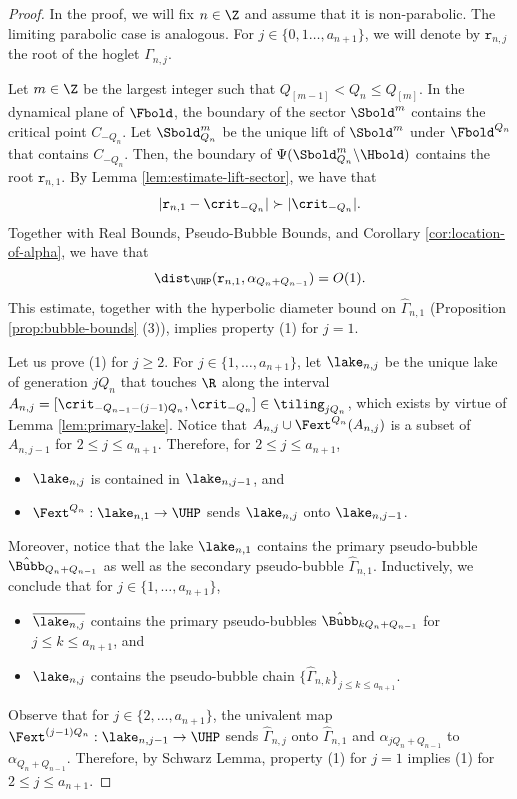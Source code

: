 \documentclass{amsart}
\begin{document}
\begin{proof}
    In the proof, we will fix $n \in \Z$ and assume that it is non-parabolic. 
    The limiting parabolic case is analogous.
    For $j \in \{0,1\ldots, a_{n+1}\}$, we will denote by $\mathtt{r}_{n,j}$ the root of the hoglet $\Gamma_{n,j}$.

    Let $m \in \Z$ be the largest integer such that $Q_{[m-1]} < Q_{n} \leq Q_{[m]}$.
    In the dynamical plane of $\Fbold$, the boundary of the sector $\Sbold^m$ contains the critical point $C_{-Q_n}$.
    Let $\Sbold^m_{Q_n}$ be the unique lift of $\Sbold^m$ under $\Fbold^{Q_n}$ that contains $C_{-Q_n}$.
    Then, the boundary of $\Psi(\Sbold^m_{Q_n} \backslash \Hbold)$ contains the root $\mathtt{r}_{n,1}$.
    By Lemma \ref{lem:estimate-lift-sector}, we have that 
    \[
    |\mathtt{r}_{n,1} - \crit_{-Q_n}| \succ |\crit_{-Q_n}|.
    \]
    Together with Real Bounds, Pseudo-Bubble Bounds, and Corollary \ref{cor:location-of-alpha}, we have that 
    \[
        \dist_{\UHP}(\mathtt{r}_{n,1},\alpha_{Q_n+Q_{n-1}}) = O(1).
    \]
    This estimate, together with the hyperbolic diameter bound on $\hat{\Gamma}_{n,1}$ (Proposition \ref{prop:bubble-bounds} (3)), implies property (1) for $j=1$.

    Let us prove (1) for $j \geq 2$.
    For $j \in \{1,\ldots,a_{n+1}\}$, let $\lake_{n,j}$ be the unique lake of generation $j Q_n$ that touches $\R$ along the interval $A_{n,j} = [\crit_{-Q_{n-1}-(j-1)Q_n},\crit_{-Q_n}] \in \tiling_{jQ_n}$,
    which exists by virtue of Lemma \ref{lem:primary-lake}.
    Notice that $A_{n,j} \cup \Fext^{Q_n}(A_{n,j})$ is a subset of $A_{n,j-1}$ for $2 \leq j \leq a_{n+1}$.
    Therefore, for $2 \leq j \leq a_{n+1}$, 
    \begin{itemize}
        \item $\lake_{n,j}$ is contained in $\lake_{n,j-1}$, and 
        \item $\Fext^{Q_n}: \lake_{n,1} \to \UHP$ sends $\lake_{n,j}$ onto $\lake_{n,j-1}$.
    \end{itemize}
    Moreover, notice that the lake $\lake_{n,1}$ contains the primary pseudo-bubble $\hat{\Bubb}_{Q_n+Q_{n-1}}$ as well as the secondary pseudo-bubble $\hat{\Gamma}_{n,1}$.
    Inductively, we conclude that for $j \in \{1,\ldots,a_{n+1}\}$, 
    \begin{itemize}
        \item $\overline{\lake_{n,j}}$ contains the primary pseudo-bubbles $\hat{\Bubb}_{k Q_n+ Q_{n-1}}$ for $j\leq k \leq a_{n+1}$, and
        \item $\lake_{n,j}$ contains the pseudo-bubble chain $\{ \hat{\Gamma}_{n,k}\}_{j \leq k \leq a_{n+1}}$. 
    \end{itemize}
    Observe that for $j \in \{2,\ldots,a_{n+1}\}$, the univalent map $\Fext^{(j-1) Q_n}: \lake_{n,j-1} \to \UHP$ sends $\hat{\Gamma}_{n,j}$ onto $\hat{\Gamma}_{n,1}$ and $\alpha_{jQ_n+Q_{n-1}}$ to $\alpha_{Q_n+Q_{n-1}}$. Therefore, by Schwarz Lemma, property (1) for $j=1$ implies (1) for $2\leq j \leq a_{n+1}$. 


\end{proof}
\end{document}
